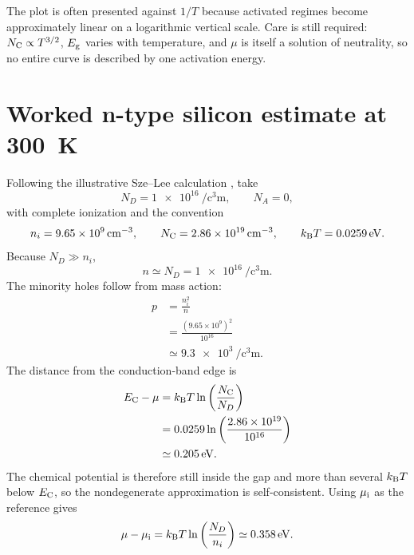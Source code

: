 The plot is often presented against $1/T$ because activated regimes become
approximately linear on a logarithmic vertical scale.  Care is still required:
$N_{\mathrm C}\propto T^{3/2}$, $E_{\mathrm g}$ varies with temperature, and $\mu$ is itself a
solution of neutrality, so no entire curve is described by one activation
energy.

\section{Worked n-type silicon estimate at \SI{300}{\kelvin}}

Following the illustrative Sze--Lee calculation
\cite[Example~4 in Sec.~1.6.1]{szeLee2012}, take
\begin{equation}
  N_D=\SI{1e16}{\per\cubic\centi\metre},
  \qquad
  N_A=0,
  \label{eq:worked-n-type-doping}
\end{equation}
with complete ionization and the convention
\begin{equation}
  n_i=\SI{9.65e9}{\per\cubic\centi\metre},
  \qquad
  N_{\mathrm C}=\SI{2.86e19}{\per\cubic\centi\metre},
  \qquad
  k_{\mathrm B} T=\SI{0.0259}{\electronvolt}.
  \label{eq:worked-n-type-parameters}
\end{equation}
Because $N_D\gg n_i$,
\begin{equation}
  n\simeq N_D
  =\SI{1e16}{\per\cubic\centi\metre}.
  \label{eq:worked-n-type-electrons}
\end{equation}
The minority holes follow from mass action:
\begin{equation}
\begin{aligned}
  p
  &=\frac{n_i^2}{n}\\
  &=\frac{(9.65\times10^9)^2}{10^{16}}\\
  &\simeq\SI{9.3e3}{\per\cubic\centi\metre}.
\end{aligned}
  \label{eq:worked-n-type-holes}
\end{equation}
The distance from the conduction-band edge is
\begin{equation}
\begin{aligned}
  E_{\mathrm C}-\mu
  &=k_{\mathrm B} T\ln\left(\frac{N_{\mathrm C}}{N_D}\right)\\
  &=0.0259\ln\left(\frac{2.86\times10^{19}}{10^{16}}\right)\\
  &\simeq\SI{0.205}{\electronvolt}.
\end{aligned}
  \label{eq:worked-n-type-fermi-edge-distance}
\end{equation}
The chemical potential is therefore still inside the gap and more than several
$k_{\mathrm B} T$ below $E_{\mathrm C}$, so the nondegenerate approximation is self-consistent.
Using $\mu_{\mathrm i}$ as the reference gives
\begin{equation}
  \mu-\mu_{\mathrm i}
  =k_{\mathrm B} T\ln\left(\frac{N_D}{n_i}\right)
  \simeq\SI{0.358}{\electronvolt}.
  \label{eq:worked-n-type-intrinsic-level-shift}
\end{equation}

